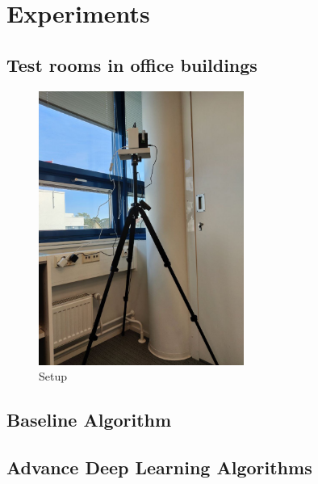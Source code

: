 \chapter{Experiments}
\label{chapter:methods}
\section{Test rooms in office buildings}
\begin{figure}[ht]
  \begin{center}
    \includegraphics[width=0.6\textwidth]{Master's thesis/images/setup.jpg} 
    \caption{Setup}
    \label{fig:AoA}
  \end{center}
\end{figure}  
\section{Baseline Algorithm}
\label{section:environments}

\section{Advance Deep Learning Algorithms}
\label{section:environments}

